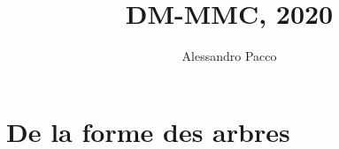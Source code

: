 \documentclass[10pt,a4paper]{book}
\author{Alessandro Pacco}
\title{DM-MMC, 2020}
\begin{document}
\maketitle


\section*{De la forme des arbres}

%
\end{document}
